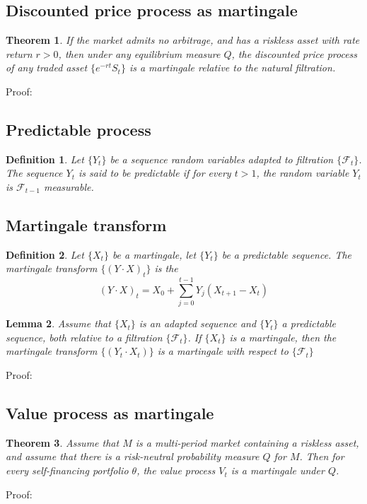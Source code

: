 \documentclass[a4paper,13pt]{report}
\newcommand{\cF}{\mathcal{F}}
\newtheorem{theorem}{Theorem}[section]
\newtheorem{lemma}[theorem]{Lemma}
\newtheorem*{definition}{Definition}
\begin{document}
\subsection{Discounted price process as martingale}
\begin{theorem}
If the market admits no arbitrage, and has a riskless asset with rate return $r>0$, then under any equilibrium measure $Q$, the discounted price process of any traded asset $\{e^{-rt}S_t\}$ is a martingale relative to the natural filtration. 
\end{theorem}
Proof:


\subsection{Predictable process}
\begin{definition}
Let $\{Y_t\}$ be a sequence random variables adapted to filtration $\{\cF_t\}$. The sequence $Y_t$ is said to be predictable if for every $t>1$, the random variable $Y_t$ is $\cF_{t-1}$ measurable.
\end{definition}

\subsection{Martingale transform}
\begin{definition}
Let $\{X_t\}$ be a martingale, let $\{Y_t\}$ be a predictable sequence. The martingale transform $\{(Y\cdot X)_t\}$ is the 
$$(Y\cdot X)_t = X_0 + \sum_{j=0}^{t-1} Y_j (X_{t+1}-X_t)$$
\end{definition}

\begin{lemma}
Assume that $\{X_t\}$ is an adapted sequence and $\{Y_t\}$ a predictable sequence, both relative to a filtration $\{\cF_t\}$. If $\{X_t\}$ is a martingale, then the martingale transform $\{(Y_t\cdot X_t)\}$ is a martingale with respect to $\{\cF_t\}$
\end{lemma}
Proof:

\subsection{Value process as martingale}
\begin{theorem}
Assume that $M$ is a multi-period market containing a riskless asset, and assume that there is a risk-neutral probability measure $Q$ for $M$. Then for every self-financing portfolio $\theta$, the value process $V_t$ is a martingale under $Q$.
\end{theorem}
Proof:
\end{document}
